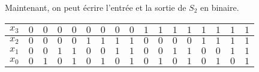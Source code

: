 \documentclass{article}
\begin{document}
Maintenant, on peut écrire l'entrée et la sortie de $S_{2}$ en binaire.
\medbreak
\begin{center}
\begin{tabular}{|l|l|l|l|l|l|l|l|l|l|l|l|l|l|l|l|l|}
\hline
\multicolumn{1}{|l|}{$x_{3}$}&	\multicolumn{1}{|l|}{ $0$}&	\multicolumn{1}{|l|}{ $0$}&	\multicolumn{1}{|l|}{ $0$}&	\multicolumn{1}{|l|}{ $0$}&	\multicolumn{1}{|l|}{ $0$}&	\multicolumn{1}{|l|}{ $0$}&	\multicolumn{1}{|l|}{ $0$}&	\multicolumn{1}{|l|}{ $0$}&	\multicolumn{1}{|l|}{ $1$}&	\multicolumn{1}{|l|}{ $1$}&	\multicolumn{1}{|l|}{ $1$}&	\multicolumn{1}{|l|}{ $1$}&	\multicolumn{1}{|l|}{ $1$}&	\multicolumn{1}{|l|}{ $1$}&	\multicolumn{1}{|l|}{ $1$}&	\multicolumn{1}{|l|}{ $1$}	\\
\hline
\multicolumn{1}{|l|}{ $x_{2}$}&	\multicolumn{1}{|l|}{ $0$}&	\multicolumn{1}{|l|}{ $0$}&	\multicolumn{1}{|l|}{ $0$}&	\multicolumn{1}{|l|}{ $0$}&	\multicolumn{1}{|l|}{ $1$}&	\multicolumn{1}{|l|}{ $1$}&	\multicolumn{1}{|l|}{ $1$}&	\multicolumn{1}{|l|}{ $1$}&	\multicolumn{1}{|l|}{ $0$}&	\multicolumn{1}{|l|}{ $0$}&	\multicolumn{1}{|l|}{ $0$}&	\multicolumn{1}{|l|}{ $0$}&	\multicolumn{1}{|l|}{ $1$}&	\multicolumn{1}{|l|}{ $1$}&	\multicolumn{1}{|l|}{ $1$}&	\multicolumn{1}{|l|}{ $1$}	\\
\hline
\multicolumn{1}{|l|}{ $x_{1}$}&	\multicolumn{1}{|l|}{ $0$}&	\multicolumn{1}{|l|}{ $0$}&	\multicolumn{1}{|l|}{ $1$}&	\multicolumn{1}{|l|}{ $1$}&	\multicolumn{1}{|l|}{ $0$}&	\multicolumn{1}{|l|}{ $0$}&	\multicolumn{1}{|l|}{ $1$}&	\multicolumn{1}{|l|}{ $1$}&	\multicolumn{1}{|l|}{ $0$}&	\multicolumn{1}{|l|}{ $0$}&	\multicolumn{1}{|l|}{ $1$}&	\multicolumn{1}{|l|}{ $1$}&	\multicolumn{1}{|l|}{ $0$}&	\multicolumn{1}{|l|}{ $0$}&	\multicolumn{1}{|l|}{ $1$}&	\multicolumn{1}{|l|}{ $1$}	\\
\hline
\multicolumn{1}{|l|}{ $x_{0}$}&	\multicolumn{1}{|l|}{ $0$}&	\multicolumn{1}{|l|}{ $1$}&	\multicolumn{1}{|l|}{ $0$}&	\multicolumn{1}{|l|}{ $1$}&	\multicolumn{1}{|l|}{ $0$}&	\multicolumn{1}{|l|}{ $1$}&	\multicolumn{1}{|l|}{ $0$}&	\multicolumn{1}{|l|}{ $1$}&	\multicolumn{1}{|l|}{ $0$}&	\multicolumn{1}{|l|}{ $1$}&	\multicolumn{1}{|l|}{ $0$}&	\multicolumn{1}{|l|}{ $1$}&	\multicolumn{1}{|l|}{ $0$}&	\multicolumn{1}{|l|}{ $1$}&	\multicolumn{1}{|l|}{ $0$}&	\multicolumn{1}{|l|}{ $1$}	\\
\hline
\end{tabular}

\smallskip


\end{center}
\end{document}
